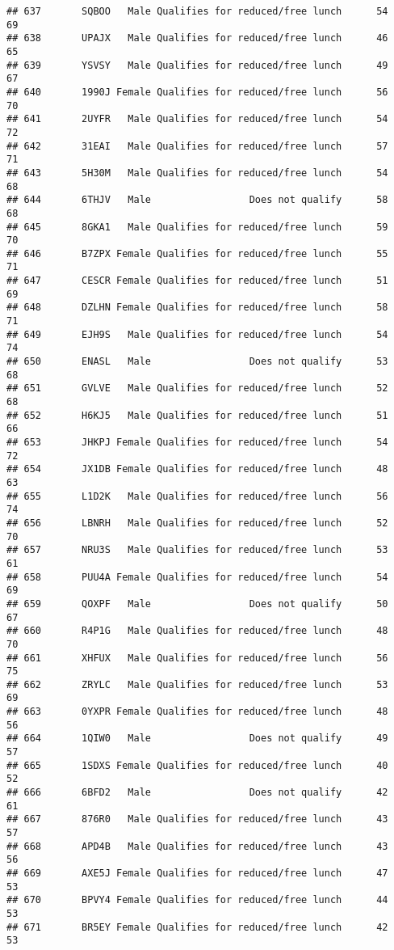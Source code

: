 \documentclass[
]{article}
\begin{document}
\begin{verbatim}
## 637       SQBOO   Male Qualifies for reduced/free lunch      54       69
## 638       UPAJX   Male Qualifies for reduced/free lunch      46       65
## 639       YSVSY   Male Qualifies for reduced/free lunch      49       67
## 640       1990J Female Qualifies for reduced/free lunch      56       70
## 641       2UYFR   Male Qualifies for reduced/free lunch      54       72
## 642       31EAI   Male Qualifies for reduced/free lunch      57       71
## 643       5H30M   Male Qualifies for reduced/free lunch      54       68
## 644       6THJV   Male                 Does not qualify      58       68
## 645       8GKA1   Male Qualifies for reduced/free lunch      59       70
## 646       B7ZPX Female Qualifies for reduced/free lunch      55       71
## 647       CESCR Female Qualifies for reduced/free lunch      51       69
## 648       DZLHN Female Qualifies for reduced/free lunch      58       71
## 649       EJH9S   Male Qualifies for reduced/free lunch      54       74
## 650       ENASL   Male                 Does not qualify      53       68
## 651       GVLVE   Male Qualifies for reduced/free lunch      52       68
## 652       H6KJ5   Male Qualifies for reduced/free lunch      51       66
## 653       JHKPJ Female Qualifies for reduced/free lunch      54       72
## 654       JX1DB Female Qualifies for reduced/free lunch      48       63
## 655       L1D2K   Male Qualifies for reduced/free lunch      56       74
## 656       LBNRH   Male Qualifies for reduced/free lunch      52       70
## 657       NRU3S   Male Qualifies for reduced/free lunch      53       61
## 658       PUU4A Female Qualifies for reduced/free lunch      54       69
## 659       QOXPF   Male                 Does not qualify      50       67
## 660       R4P1G   Male Qualifies for reduced/free lunch      48       70
## 661       XHFUX   Male Qualifies for reduced/free lunch      56       75
## 662       ZRYLC   Male Qualifies for reduced/free lunch      53       69
## 663       0YXPR Female Qualifies for reduced/free lunch      48       56
## 664       1QIW0   Male                 Does not qualify      49       57
## 665       1SDXS Female Qualifies for reduced/free lunch      40       52
## 666       6BFD2   Male                 Does not qualify      42       61
## 667       876R0   Male Qualifies for reduced/free lunch      43       57
## 668       APD4B   Male Qualifies for reduced/free lunch      43       56
## 669       AXE5J Female Qualifies for reduced/free lunch      47       53
## 670       BPVY4 Female Qualifies for reduced/free lunch      44       53
## 671       BR5EY Female Qualifies for reduced/free lunch      42       53

\end{verbatim}
\end{document}
